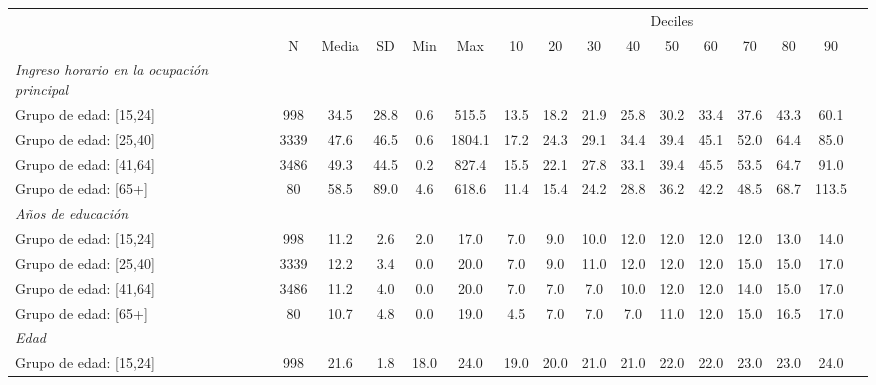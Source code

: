 
\begin{tabular}{l*{15}{c}}
\hline\hline
 & \multicolumn{6}{c}{} & \multicolumn{7}{c}{\centering Deciles} \\ \cmidrule(lr){7-15}
 & N & Media & SD & Min & Max & 10 & 20 & 30 & 40 & 50 & 60 & 70 & 80 & 90  \\
\hline
\textit{Ingreso horario en la ocupación principal} \\
\hspace{0.25cm} Grupo de edad: [15,24] & 998 &  34.5 &  28.8 &   0.6 & 515.5 &  13.5 &  18.2 &  21.9 &  25.8 &  30.2 &  33.4 &  37.6 &  43.3 &  60.1 \\
\hspace{0.25cm}  Grupo de edad: [25,40] & 3339 &  47.6 &  46.5 &   0.6 & 1804.1 &  17.2 &  24.3 &  29.1 &  34.4 &  39.4 &  45.1 &  52.0 &  64.4 &  85.0 \\
\hspace{0.25cm}  Grupo de edad: [41,64] & 3486 &  49.3 &  44.5 &   0.2 & 827.4 &  15.5 &  22.1 &  27.8 &  33.1 &  39.4 &  45.5 &  53.5 &  64.7 &  91.0 \\
\hspace{0.25cm}  Grupo de edad: [65+] & 80 &  58.5 &  89.0 &   4.6 & 618.6 &  11.4 &  15.4 &  24.2 &  28.8 &  36.2 &  42.2 &  48.5 &  68.7 & 113.5 \\
\textit{Años de educación} \\
\hspace{0.25cm} Grupo de edad: [15,24] & 998 &  11.2 &   2.6 &   2.0 &  17.0 &   7.0 &   9.0 &  10.0 &  12.0 &  12.0 &  12.0 &  12.0 &  13.0 &  14.0 \\
\hspace{0.25cm}  Grupo de edad: [25,40] & 3339 &  12.2 &   3.4 &   0.0 &  20.0 &   7.0 &   9.0 &  11.0 &  12.0 &  12.0 &  12.0 &  15.0 &  15.0 &  17.0 \\
\hspace{0.25cm}  Grupo de edad: [41,64] & 3486 &  11.2 &   4.0 &   0.0 &  20.0 &   7.0 &   7.0 &   7.0 &  10.0 &  12.0 &  12.0 &  14.0 &  15.0 &  17.0 \\
\hspace{0.25cm}  Grupo de edad: [65+] & 80 &  10.7 &   4.8 &   0.0 &  19.0 &   4.5 &   7.0 &   7.0 &   7.0 &  11.0 &  12.0 &  15.0 &  16.5 &  17.0 \\
\textit{Edad} \\
\hspace{0.25cm} Grupo de edad: [15,24] & 998 &  21.6 &   1.8 &  18.0 &  24.0 &  19.0 &  20.0 &  21.0 &  21.0 &  22.0 &  22.0 &  23.0 &  23.0 &  24.0 \\

\end{tabular}
